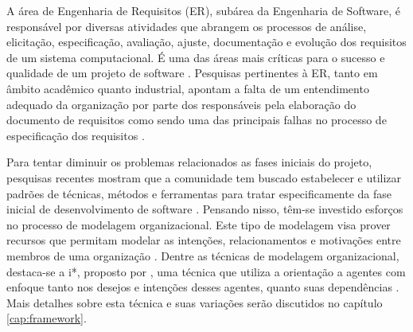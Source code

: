             A área de Engenharia de Requisitos (ER), subárea da Engenharia de Software, é responsável por diversas atividades que abrangem os processos de análise, elicitação, especificação, avaliação, ajuste, documentação e evolução dos requisitos de um sistema computacional.
            É uma das áreas mais críticas para o sucesso e qualidade de um projeto de software \cite{sommerville1998requirements}.
            Pesquisas pertinentes à ER, tanto em âmbito acadêmico quanto industrial,
            apontam a falta de um entendimento adequado da organização por parte dos responsáveis pela elaboração do documento de requisitos
            como sendo uma das principais falhas no processo de especificação dos requisitos
                \cite{van2000requirements}.

                Para tentar diminuir os problemas relacionados as fases iniciais do projeto,
                pesquisas recentes mostram que a comunidade tem buscado estabelecer e utilizar padrões de técnicas, métodos e ferramentas para tratar especificamente
                da fase inicial de desenvolvimento de software
                        \cite{schneider2013literature}.
                Pensando nisso,
                têm-se investido esforços no processo de modelagem organizacional.
                Este tipo de modelagem
                visa prover recursos que permitam modelar
                as intenções, relacionamentos e motivações
                entre membros de uma organização
                    \cite{mason1997conceptual}.
                Dentre as técnicas de modelagem organizacional,
                destaca-se a i*,
                proposto por
                    \cite{yu1993modeling},
                uma técnica que utiliza a orientação a agentes
                    \cite{yu2001agent}
                    com enfoque
                    tanto nos desejos e intenções desses agentes, quanto suas dependências
                        \cite{site2013iwiki}
                        \cite{yu1997towards}.
                Mais detalhes sobre esta técnica e suas variações serão discutidos no capítulo
                \ref{cap:framework}.

